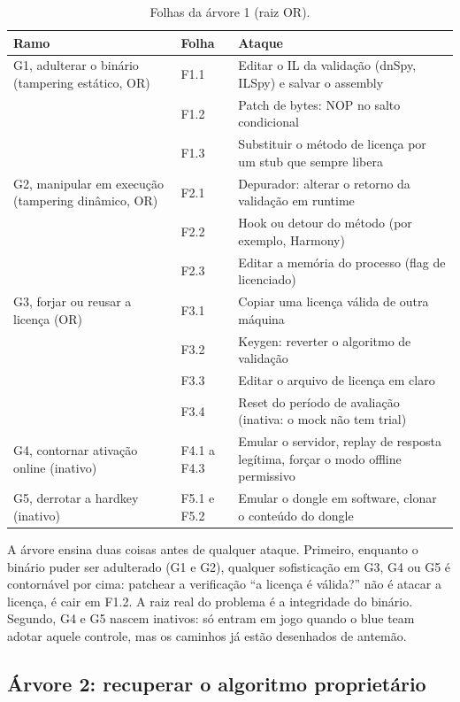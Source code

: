 \begin{table}[htbp]
\centering
\caption{Folhas da árvore 1 (raiz OR).}
\label{qd:arvore1}
\small
\begin{tabular}{L{4.4cm}L{1.2cm}L{8.8cm}}
\toprule
Ramo & Folha & Ataque \\
\midrule
G1, adulterar o binário (tampering estático, OR) & F1.1 & Editar o IL da validação (dnSpy, ILSpy) e salvar o assembly \\
 & F1.2 & Patch de bytes: NOP no salto condicional \\
 & F1.3 & Substituir o método de licença por um stub que sempre libera \\
\midrule
G2, manipular em execução (tampering dinâmico, OR) & F2.1 & Depurador: alterar o retorno da validação em runtime \\
 & F2.2 & Hook ou detour do método (por exemplo, Harmony) \\
 & F2.3 & Editar a memória do processo (flag de licenciado) \\
\midrule
G3, forjar ou reusar a licença (OR) & F3.1 & Copiar uma licença válida de outra máquina \\
 & F3.2 & Keygen: reverter o algoritmo de validação \\
 & F3.3 & Editar o arquivo de licença em claro \\
 & F3.4 & Reset do período de avaliação (inativa: o mock não tem trial) \\
\midrule
G4, contornar ativação online (inativo) & F4.1 a F4.3 & Emular o servidor, replay de resposta legítima, forçar o modo offline permissivo \\
\midrule
G5, derrotar a hardkey (inativo) & F5.1 e F5.2 & Emular o dongle em software, clonar o conteúdo do dongle \\
\bottomrule
\end{tabular}
\end{table}

A árvore ensina duas coisas antes de qualquer ataque. Primeiro, enquanto o binário puder ser adulterado (G1 e G2), qualquer sofisticação em G3, G4 ou G5 é contornável por cima: patchear a verificação \enquote{a licença é válida?} não é atacar a licença, é cair em F1.2. A raiz real do problema é a integridade do binário. Segundo, G4 e G5 nascem inativos: só entram em jogo quando o blue team adotar aquele controle, mas os caminhos já estão desenhados de antemão.

\subsection{Árvore 2: recuperar o algoritmo proprietário}

